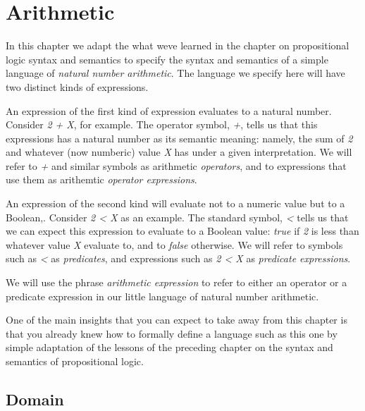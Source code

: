 \documentclass{book}
\begin{document}
\hypertarget{pandoc.profile.debug__pandoc__debug__src__arithmetic.md}{}
\hypertarget{pandoc.profile.debug__pandoc__debug__src__arithmetic.md__arithmetic}{%
\chapter{Arithmetic}\label{pandoc.profile.debug__pandoc__debug__src__arithmetic.md__arithmetic}}

In this chapter we adapt the what we\textquotesingle ve learned in the
chapter on propositional logic syntax and semantics to
specify the syntax and semantics of a simple language of
\emph{natural number arithmetic}. The language we specify here
will have two distinct kinds of expressions.

An expression of the first kind of expression evaluates
to a natural number. Consider \emph{2 + X}, for example. The
operator symbol, \emph{+}, tells us that this expressions has
a natural number as its semantic meaning: namely, the sum
of \emph{2} and whatever (now numberic) value \emph{X} has under a
given interpretation. We will refer to \emph{+} and similar
symbols as arithmetic \emph{operators}, and to expressions
that use them as arithemtic \emph{operator expressions}.

An expression of the second kind will evaluate not to a
numeric value but to a Boolean,. Consider \emph{2 \textless{} X} as an
example. The standard symbol, \emph{\textless{}} tells us that we can
expect this expression to evaluate to a Boolean value:
\emph{true} if \emph{2} is less than whatever value \emph{X} evaluate
to, and to \emph{false} otherwise. We will refer to symbols
such as \emph{\textless{}} as \emph{predicates}, and expressions such as
\emph{2 \textless{} X} as \emph{predicate expressions}.

We will use the phrase \emph{arithmetic expression} to refer
to either an operator or a predicate expression in our
little language of natural number arithmetic.

One of the main insights that you can expect to take
away from this chapter is that you already knew how to
formally define a language such as this one by simple
adaptation of the lessons of the preceding chapter on
the syntax and semantics of propositional logic.

\hypertarget{pandoc.profile.debug__pandoc__debug__src__dmt1__lectures__l04_natarithmetic__domain.lean.md}{}
\hypertarget{pandoc.profile.debug__pandoc__debug__src__dmt1__lectures__l04_natarithmetic__domain.lean.md__domain}{%
\section{Domain}\label{pandoc.profile.debug__pandoc__debug__src__dmt1__lectures__l04_natarithmetic__domain.lean.md__domain}}
\end{document}
